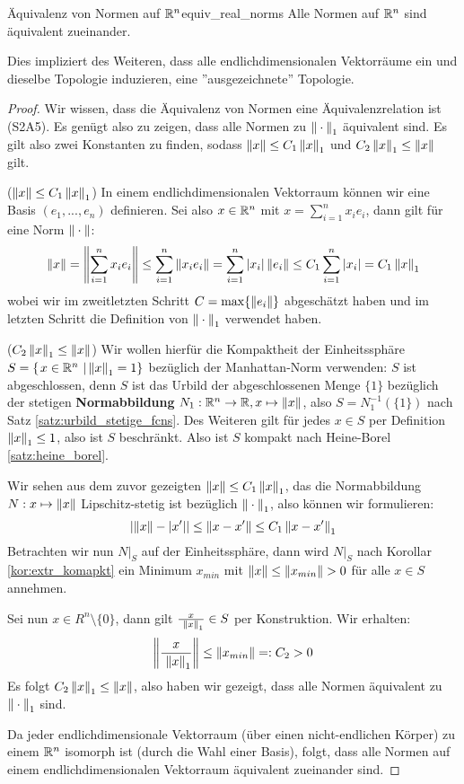 \begin{satz}{Äquivalenz von Normen auf $\mathbb{R}^n$}{equiv_real_norms}
Alle Normen auf $\mathbb{R}^n$ sind äquivalent zueinander.
\end{satz}
Dies impliziert des Weiteren, dass alle endlichdimensionalen Vektorräume ein und dieselbe Topologie induzieren, eine ''ausgezeichnete'' Topologie.
\begin{proof}
Wir wissen, dass die Äquivalenz von Normen eine Äquivalenzrelation ist (S2A5). Es genügt also zu zeigen, dass alle Normen zu $\left\|\:\cdot\:\right\|_1$ äquivalent sind. Es gilt also zwei Konstanten zu finden, sodass $\left\|x\right\| \leq C_1 \left\|x\right\|_1$ und $C_2 \left\|x\right\|_1 \leq \left\|x\right\|$ gilt.

($\left\|x\right\| \leq C_1 \left\|x\right\|_1$) In einem endlichdimensionalen Vektorraum können wir eine Basis $(e_1, ..., e_n)$ definieren. Sei also $x \in \mathbb{R}^n$ mit $x = \sum_{i=1}^n x_i e_i$, dann gilt für eine Norm $\left\|\:\cdot\:\right\|$:
$$ \left\|x\right\| = \left\|\sum_{i=1}^n x_i e_i\right\| \leq \sum_{i=1}^n \left\| x_i e_i\right\| = \sum_{i=1}^n \left|x_i\right| \left\|e_i\right\| \leq C_1 \sum_{i=1}^n \left|x_i\right| = C_1 \left\|x\right\|_1$$
wobei wir im zweitletzten Schritt $C = \max\{\left\|e_i\right\|\}$ abgeschätzt haben und im letzten Schritt die Definition von $\left\|\:\cdot\:\right\|_1$ verwendet haben.

($C_2 \left\|x\right\|_1 \leq \left\|x\right\|$) Wir wollen hierfür die Kompaktheit der Einheitssphäre $S = \left\{\left.x \in \mathbb{R}^n \ \right| \left\|x\right\|_1 = 1 \right\}$ bezüglich der Manhattan-Norm verwenden: $S$ ist abgeschlossen, denn $S$ ist das Urbild der abgeschlossenen Menge $\{1\}$ bezüglich der stetigen \textbf{Normabbildung} $N_1: \mathbb{R}^n \to \mathbb{R}, x \mapsto \left\|x\right\|$, also $S = N_1^{-1}(\{1\})$ nach Satz \ref{satz:urbild_stetige_fcns}. Des Weiteren gilt für jedes $x \in S$ per Definition $\left\|x\right\|_1 \leq 1$, also ist $S$ beschränkt. Also ist $S$ kompakt nach Heine-Borel \ref{satz:heine_borel}.

Wir sehen aus dem zuvor gezeigten $\left\|x\right\| \leq C_1 \left\|x\right\|_1$, das die Normabbildung $N: x \mapsto \left\|x\right\|$ Lipschitz-stetig ist bezüglich $\left\|\:\cdot\:\right\|_1$, also können wir formulieren:
$$\left|\left\|x\right\|-\left|x'\right|\right| \leq \left\|x-x'\right\| \leq C_1 \left\|x-x'\right\|_1$$
Betrachten wir nun $N\vert_S$ auf der Einheitssphäre, dann wird $N\vert_S$ nach Korollar \ref{kor:extr_komapkt} ein Minimum $x_{min}$ mit $\left\|x\right\| \leq \left\|x_{min}\right\| > 0$ für alle $x \in S$ annehmen.

Sei nun $x \in R^n\setminus\{0\}$, dann gilt $\frac{x}{\ \left\|x\right\|_1} \in S$ per Konstruktion. Wir erhalten:
$$\left\|\frac{x}{\ \left\|x\right\|_1}\right\| \leq \left\|x_{min}\right\| =: C_2 > 0$$
Es folgt $C_2 \left\|x\right\|_1 \leq \left\|x\right\|$, also haben wir gezeigt, dass alle Normen äquivalent zu $\left\|\:\cdot\:\right\|_1$ sind.

Da jeder endlichdimensionale Vektorraum (über einen nicht-endlichen Körper) zu einem $\mathbb{R}^n$ isomorph ist (durch die Wahl einer Basis), folgt, dass alle Normen auf einem endlichdimensionalen Vektorraum äquivalent zueinander sind.
\end{proof}
